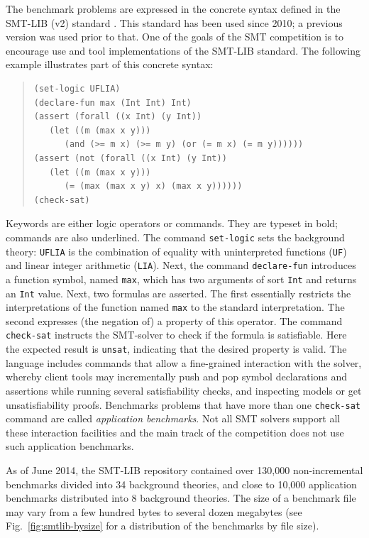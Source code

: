 \documentclass[twoside,11pt]{article}
\begin{document}
The benchmark problems are expressed in the concrete syntax defined in the SMT-LIB (v2) standard \cite{BarST-RR-10}. This standard has been used since 2010; a previous version was used prior to that. One of the goals of the SMT competition is to encourage use and tool implementations of the SMT-LIB standard. The following example illustrates part of this concrete syntax:
\begin{quote}
\lstset{frameround=fttt}
\begin{lstlisting}[frame=trBL]
(set-logic UFLIA)
(declare-fun max (Int Int) Int)
(assert (forall ((x Int) (y Int))
   (let ((m (max x y)))
      (and (>= m x) (>= m y) (or (= m x) (= m y))))))
(assert (not (forall ((x Int) (y Int))
   (let ((m (max x y)))
      (= (max (max x y) x) (max x y))))))
(check-sat)
\end{lstlisting}
\end{quote}
Keywords are either logic operators or commands. They are typeset in bold;
commands are also underlined.  The command \lstinline{set-logic}
sets the background theory: \lstinline{UFLIA} is the combination of
equality with uninterpreted functions (\lstinline{UF}) and linear
integer arithmetic (\lstinline{LIA}). Next, the command
\lstinline{declare-fun} introduces a function symbol, named
\lstinline{max}, which has two arguments of sort \lstinline{Int} and
returns an \lstinline{Int} value. Next, two formulas are asserted. The
first essentially restricts the interpretations of the function named
\lstinline{max} to the standard interpretation. The second expresses
(the negation of) a property of this operator. The command
\lstinline{check-sat} instructs the SMT-solver to check if the formula
is satisfiable. Here the expected result is \lstinline{unsat},
indicating that the desired property is valid. The language includes
commands that allow a fine-grained interaction with the solver,
whereby client tools may incrementally push and pop symbol
declarations and assertions while running several satisfiability
checks, and inspecting models or get unsatisfiability
proofs. Benchmarks problems that have more than one
\lstinline{check-sat} command are called \emph{application
  benchmarks}. Not all SMT solvers support all these interaction
facilities and the main track of the competition does not use such
application benchmarks.

As of June 2014, the SMT-LIB repository contained over 130,000
non-incremental benchmarks divided into 34 background theories, and
close to 10,000 application benchmarks distributed into 8 background
theories. The size of a benchmark file may vary from a few hundred
bytes to several dozen megabytes (see Fig.~\ref{fig:smtlib-bysize} for
a distribution of the benchmarks by file size).
\end{document}
